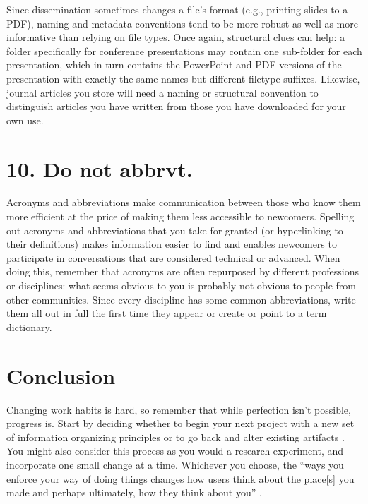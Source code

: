 \documentclass[10pt,letterpaper]{article}
\newcommand{\rulemajor}[1]{\section*{#1}}
\begin{document}
Since dissemination sometimes changes a file's format (e.g., printing slides to
a PDF), naming and metadata conventions tend to be more robust as well as more
informative than relying on file types. Once again, structural clues can help:
a folder specifically for conference presentations may contain one sub-folder
for each presentation, which in turn contains the PowerPoint and PDF versions of
the presentation with exactly the same names but different filetype suffixes.
Likewise, journal articles you store will need a naming or structural convention
to distinguish articles you have written from those you have downloaded for your
own use.

\rulemajor{10. Do not abbrvt.}

Acronyms and abbreviations make communication between those who know them more
efficient at the price of making them less accessible to newcomers. Spelling
out acronyms and abbreviations that you take for granted (or hyperlinking to
their definitions) makes information easier to find and enables newcomers to
participate in conversations that are considered technical or advanced. When
doing this, remember that acronyms are often repurposed by different professions
or disciplines: what seems obvious to you is probably not obvious to people from
other communities. Since every discipline has some common abbreviations, write
them all out in full the first time they appear or create or point to a term
dictionary.

\section*{Conclusion}

Changing work habits is hard, so remember that while perfection isn't possible,
progress is. Start by deciding whether to begin your next project with a new
set of information organizing principles or to go back and alter existing
artifacts \cite{Briney2015}. You might also consider this process as you would
a research experiment, and incorporate one small change at a time. Whichever
you choose, the ``ways you enforce your way of doing things changes how users
think about the place[s] you made and perhaps ultimately, how they think about
you'' \cite{Covert2014}.
\end{document}
